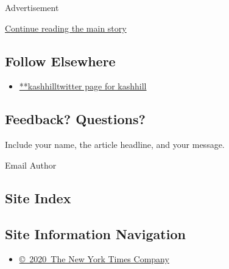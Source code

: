 Advertisement

\protect\hyperlink{after-mid2}{Continue reading the main story}

\hypertarget{follow-elsewhere}{%
\subsection{Follow Elsewhere}\label{follow-elsewhere}}

\begin{itemize}
\tightlist
\item
  \href{https://twitter.com/kashhill}{**kashhilltwitter page for
  kashhill}
\end{itemize}

\hypertarget{feedback-questions}{%
\subsection{Feedback? Questions?}\label{feedback-questions}}

Include your name, the article headline, and your message.

Email Author

\hypertarget{site-index}{%
\subsection{Site Index}\label{site-index}}

\hypertarget{site-information-navigation}{%
\subsection{Site Information
Navigation}\label{site-information-navigation}}

\begin{itemize}
\tightlist
\item
  \href{https://help.nytimes.com/hc/en-us/articles/115014792127-Copyright-notice}{©~2020~The
  New York Times Company}
\end{itemize}

